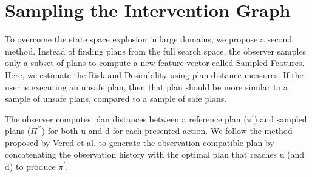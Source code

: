 \documentclass[doctor]{thesis} %
\theoremstyle{plain}
\begin{document}
\section*{Sampling the Intervention Graph}
To overcome the state space explosion in large domains, we propose a second method. Instead of finding plans from the full search space, the observer samples only a subset of plans to compute a new feature vector called Sampled Features. Here, we estimate the Risk and Desirability using plan distance measures. If the user is executing an unsafe plan, then that plan should be more similar to a sample of unsafe plans, compared to a sample of safe plans. 

The observer computes plan distances between a reference plan ($\pi^\prime$) and sampled plans ($\Pi^{\prime\prime}$) for both $\mathrm{u}$ and $\mathrm{d}$ for each presented action. 
We follow the method proposed by Vered et al.  to generate the observation compatible plan by concatenating the observation history with the optimal plan that reaches $\mathrm{u}$ (and $\mathrm{d}$) to produce $\pi^\prime$. 
\end{document}
